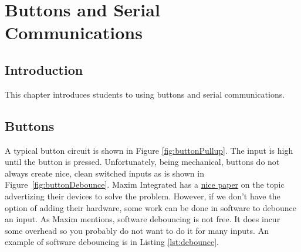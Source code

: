 \chapter{Buttons and Serial Communications}

\section{Introduction}
This chapter introduces students to using buttons and serial communications.

\section{Buttons}

A typical button circuit is shown in Figure \ref{fig:buttonPullup}. The input is high until the button is pressed.
Unfortunately, being mechanical, buttons do not always create nice, clean switched inputs as is shown in 
Figure~\ref{fig:buttonDebounce}. Maxim Integrated has a 
\href{https://www.maximintegrated.com/en/design/technical-documents/app-notes/2/287.html}{nice paper} on the topic
advertizing their devices to solve the problem. However, if we don't have the option of adding their hardware, some 
work can be done in software to debounce an input. As Maxim mentions, software debouncing is not free. It does incur
some overhead so you probably do not want to do it for many inputs. An example of software debouncing is in 
Listing \ref{lst:debounce}.

